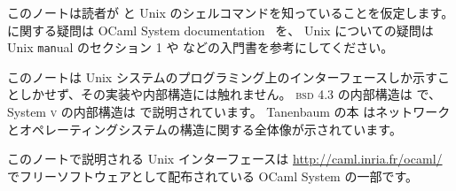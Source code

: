 
このノートは読者が \ocaml と Unix のシェルコマンドを知っていることを仮定します。
\ocaml に関する疑問は OCaml System documentation~\cite{OCaml} を、 Unix についての疑問は Unix \texttt{man}ual のセクション 1 や \cite{KP,R1} などの入門書を参考にしてください。


このノートは Unix システムのプログラミング上のインターフェースしか示すことしかせず、その実装や内部構造には触れません。
\textsc{bsd} 4.3 の内部構造は \cite{BSD} で、 System \textsc{v} の内部構造は \cite{Bach} で説明されています。
Tanenbaum の本 \cite{T1, T2} はネットワークとオペレーティングシステムの構造に関する全体像が示されています。

このノートで説明される Unix インターフェースは \url{http://caml.inria.fr/ocaml/} でフリーソフトウェアとして配布されている OCaml System の一部です。
